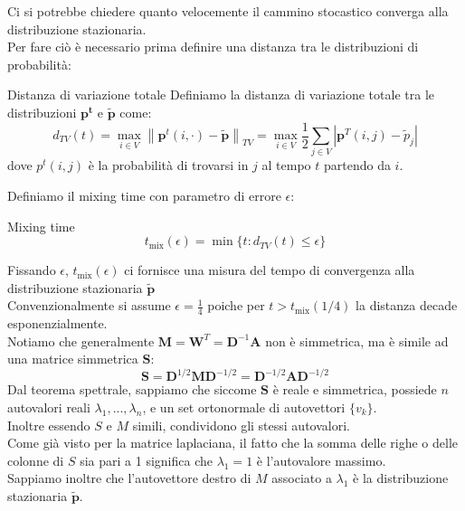 Ci si potrebbe chiedere quanto velocemente il cammino stocastico converga alla distribuzione stazionaria.\\
Per fare ciò è necessario prima definire una distanza tra le distribuzioni di probabilità:
\begin{boxb}{Distanza di variazione totale}
    Definiamo la distanza di variazione totale tra le distribuzioni $\mathbf{p^{t}}$ e $\mathbf{\tilde{p}}$ come:
    \begin{equation}
            d_{TV}(t)= \max_{i \in V}\left\lVert \mathbf{p}^{t}(i,\cdot)-\mathbf{\tilde{p}} \right\rVert_{TV}=\max_{i \in V}\frac{1}{2}\sum_{j \in V}^{}\left\lvert \mathbf{p}^T(i,j)-\tilde{p}_j\right\rvert 
    \end{equation}
    dove $p^{t}(i,j)$ è la probabilità di trovarsi in $j$ al tempo $t$ partendo da $i$.
\end{boxb}

Definiamo il mixing time con parametro di errore $\epsilon$:
\begin{boxb}{Mixing time}
    \begin{equation}
            t_{\text{mix}}(\epsilon)=\min\{ t : d_{TV}(t) \le \epsilon \} 
    \end{equation}
\end{boxb}
Fissando $\epsilon$, $t_{\text{mix}}(\epsilon)$ ci fornisce una misura del tempo di convergenza alla distribuzione stazionaria $\mathbf{\tilde{p}}$\\
Convenzionalmente si assume $\epsilon=\frac{1}{4}$ poiche per $t > t_{\text{mix}}(1/4)$ la distanza decade esponenzialmente.\\

Notiamo che generalmente $\mathbf{M}=\mathbf{W}^T=\mathbf{D}^{-1}\mathbf{A}$ non è simmetrica, ma è simile ad una matrice simmetrica $\mathbf{S}$:
\begin{equation}
    \mathbf{S}=\mathbf{D}^{1/2}\mathbf{M}\mathbf{D}^{-1/2}=\mathbf{D}^{-1/2}\mathbf{A}\mathbf{D}^{-1/2}
\end{equation}
Dal teorema spettrale, sappiamo che siccome $\mathbf{S}$ è reale e simmetrica, possiede $n$ autovalori reali $\lambda_1, ..., \lambda_n$, e un set ortonormale di autovettori $\{ v_k\}$.\\
Inoltre essendo $S$ e $M$ simili, condividono gli stessi autovalori.\\

Come già visto per la matrice laplaciana, il fatto che la somma delle righe o delle colonne di $S$ sia pari a 1 significa che $\lambda_1=1$ è l'autovalore massimo.\\
Sappiamo inoltre che l'autovettore destro di $M$ associato a $\lambda_1$ è la distribuzione stazionaria $\mathbf{\tilde{p}}$.\\


